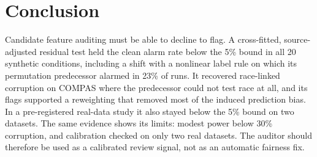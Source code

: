 \documentclass[conference]{IEEEtran}
\begin{document}
\section{Conclusion}
Candidate feature auditing must be able to decline to flag. A cross-fitted, source-adjusted residual test held the clean alarm rate below the 5\% bound in all 20 synthetic conditions, including a shift with a nonlinear label rule on which its permutation predecessor alarmed in 23\% of runs. It recovered race-linked corruption on COMPAS where the predecessor could not test race at all, and its flags supported a reweighting that removed most of the induced prediction bias. In a pre-registered real-data study it also stayed below the 5\% bound on two datasets. The same evidence shows its limits: modest power below 30\% corruption, and calibration checked on only two real datasets. The auditor should therefore be used as a calibrated review signal, not as an automatic fairness fix.



\end{document}
